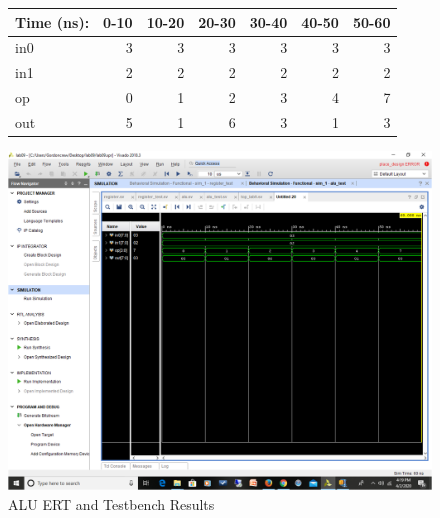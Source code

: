 \documentclass[11pt]{article}
\begin{document}
\begin{figure}[ht]\centering
	\begin{tabular}{l|rrrrrr}
		Time (ns): & 0-10 & 10-20 & 20-30 & 30-40 & 40-50 & 50-60 \\
		\midrule
		in0 & 3 & 3 & 3 & 3 & 3 & 3 \\
		in1 & 2 & 2 & 2 & 2 & 2 & 2 \\
		op & 0 & 1 & 2 & 3 & 4 & 7 \\
		\midrule
		out & 5 & 1 & 6 & 3 & 1 & 3 \\
		\bottomrule
	\end{tabular}\medskip
	
	\includegraphics[width=1.15\textwidth, trim=5.8cm 12cm 0cm 4.0cm,clip]{alu.png}
	\caption{ALU ERT and Testbench Results}
	\label{fig:sim_with_table}
\end{figure}


\clearpage
\end{document}
